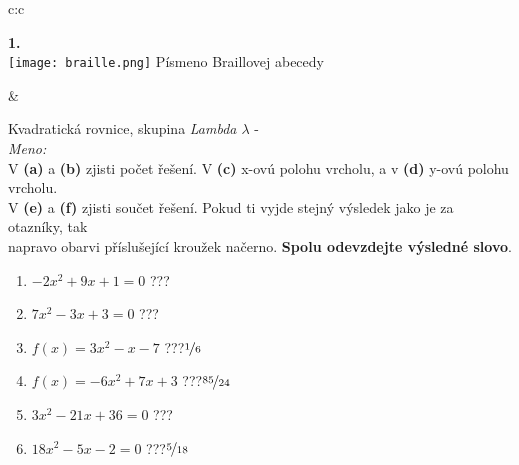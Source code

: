\documentclass[10pt]{report}
\begin{document}
\begin{tabular}{c:c}
\begin{minipage}[c][99mm][t]{0.49\linewidth}
\begin{center}
\begin{minipage}{0.20\linewidth}
\begin{center}
{\Huge\bfseries 1.} \\[2mm]
\texttt{[image: braille.png]}
{\small Písmeno Braillovej abecedy}
\end{center}
\end{minipage}
\end{center}
\end{minipage}
&
\begin{minipage}[c][99mm][t]{0.49\linewidth}
\begin{center}
\vspace{7mm}
{\huge Kvadratická rovnice, skupina \textit{Lambda $\lambda$} -}\\[4.5mm]
\textit{Meno:}\phantom{xxxxxxxxxxxxxxxxxxxxxxxxxxxxxxxxxxxxxxxxxxxxxxxxxxxxxxxxxxxxxxxxx}\\[3.5mm]
V \textbf{(a)} a \textbf{(b)} zjisti počet řešení. V \textbf{(c)} x-ovú polohu vrcholu, a v \textbf{(d)} y-ovú polohu vrcholu.\\V \textbf{(e)} a \textbf{(f)} zjisti součet řešení. Pokud ti vyjde stejný výsledek jako je za otazníky, tak\\napravo obarvi příslušející kroužek načerno. \textbf{Spolu odevzdejte výsledné slovo}.\\[3mm]
\begin{minipage}{0.77\linewidth}
\begin{center}
\begin{varwidth}{\textwidth}
\begin{enumerate}
\large
\item $-2x^2+9x+1=0$\quad \dotfill\; ???\;\dotfill {}
\item $7x^2-3x+3=0$\quad \dotfill\; ???\;\dotfill {}
\item $f(x)=3x^2-x-7$\quad \dotfill\; ???\;\dotfill \quad $\nicefrac{1}{6}$
\item $f(x)=-6x^2+7x+3$\quad \dotfill\; ???\;\dotfill \quad $\nicefrac{85}{24}$
\item $3x^2-21x+36=0$\quad \dotfill\; ???\;\dotfill {}
\item $18x^2-5x-2=0$\quad \dotfill\; ???\;\dotfill \quad $\nicefrac{5}{18}$
\end{enumerate}
\end{varwidth}
\end{center}
\end{minipage}
\begin{minipage}{0.20\linewidth}

\end{minipage}
\end{center}
\end{minipage}
\end{tabular}
\end{document}
